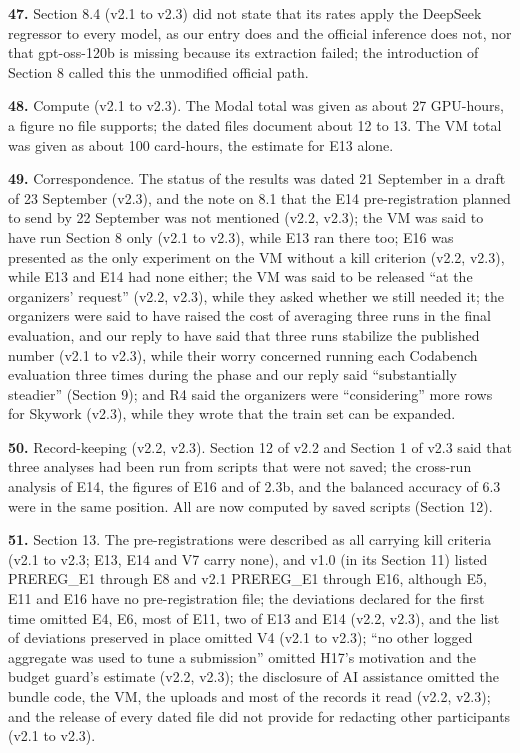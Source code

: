 \noindent\textbf{47.} Section 8.4 (v2.1 to v2.3) did not state that its rates apply the DeepSeek regressor to every model, as our entry does and the official inference does not, nor that gpt-oss-120b is missing because its extraction failed; the introduction of Section 8 called this the unmodified official path.
\par

\noindent\textbf{48.} Compute (v2.1 to v2.3). The Modal total was given as about 27 GPU-hours, a figure no file supports; the dated files document about 12 to 13. The VM total was given as about 100 card-hours, the estimate for E13 alone.
\par

\noindent\textbf{49.} Correspondence. The status of the results was dated 21 September in a draft of 23 September (v2.3), and the note on 8.1 that the E14 pre-registration planned to send by 22 September was not mentioned (v2.2, v2.3); the VM was said to have run Section 8 only (v2.1 to v2.3), while E13 ran there too; E16 was presented as the only experiment on the VM without a kill criterion (v2.2, v2.3), while E13 and E14 had none either; the VM was said to be released ``at the organizers' request'' (v2.2, v2.3), while they asked whether we still needed it; the organizers were said to have raised the cost of averaging three runs in the final evaluation, and our reply to have said that three runs stabilize the published number (v2.1 to v2.3), while their worry concerned running each Codabench evaluation three times during the phase and our reply said ``substantially steadier'' (Section 9); and R4 said the organizers were ``considering'' more rows for Skywork (v2.3), while they wrote that the train set can be expanded.
\par

\noindent\textbf{50.} Record-keeping (v2.2, v2.3). Section 12 of v2.2 and Section 1 of v2.3 said that three analyses had been run from scripts that were not saved; the cross-run analysis of E14, the figures of E16 and of 2.3b, and the balanced accuracy of 6.3 were in the same position. All are now computed by saved scripts (Section 12).
\par

\noindent\textbf{51.} Section 13. The pre-registrations were described as all carrying kill criteria (v2.1 to v2.3; E13, E14 and V7 carry none), and v1.0 (in its Section 11) listed PREREG\_E1 through E8 and v2.1 PREREG\_E1 through E16, although E5, E11 and E16 have no pre-registration file; the deviations declared for the first time omitted E4, E6, most of E11, two of E13 and E14 (v2.2, v2.3), and the list of deviations preserved in place omitted V4 (v2.1 to v2.3); ``no other logged aggregate was used to tune a submission'' omitted H17's motivation and the budget guard's estimate (v2.2, v2.3); the disclosure of AI assistance omitted the bundle code, the VM, the uploads and most of the records it read (v2.2, v2.3); and the release of every dated file did not provide for redacting other participants (v2.1 to v2.3).
\par

